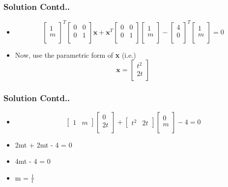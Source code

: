 \documentclass[12pt]{beamer}
\begin{document}
\begin{frame}
\frametitle{Solution Contd..}
\begin{itemize}
\item<1-2>
\[
\begin{bmatrix}
    1\\
    m\\  
\end{bmatrix}^T
\begin{bmatrix}
    0 & 0\\
    0 & 1\\  
\end{bmatrix}
\textbf{x} + 
\textbf{x}^T
\begin{bmatrix}
    0 & 0\\
    0 & 1\\  
\end{bmatrix}
\begin{bmatrix}
    1\\
    m\\  
\end{bmatrix} - 
\begin{bmatrix}
    4\\
    0\\  
\end{bmatrix}^T
\begin{bmatrix}
    1\\
    m\\  
\end{bmatrix} = 0
\]
\item<2> Now, use the parametric form of \textbf{x} (i.e.)
\[
\textbf{x} = 
\begin{bmatrix}
    t^2\\
    2t\\  
\end{bmatrix}
\]
\end{itemize}
\end{frame}



\begin{frame}
\frametitle{Solution Contd..}
\begin{itemize}
\item<1-4>
\[
\begin{bmatrix}
    1 & m  
\end{bmatrix}
\begin{bmatrix}
    0\\
    2t\\  
\end{bmatrix} + 
\begin{bmatrix}
    t^2 & 2t  
\end{bmatrix}
\begin{bmatrix}
    0\\
    m\\  
\end{bmatrix} - 4 = 0
\]
\item<2-4> 2mt + 2mt - 4 = 0
\item<3-4> 4mt - 4 = 0
\item<4> m = $\frac{1}{t}$
\end{itemize}
\end{frame}
\end{document}
